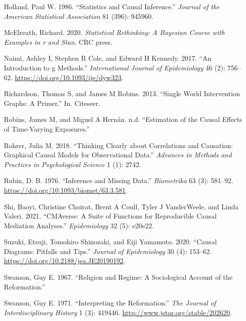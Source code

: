 \documentclass[
  singlecolumn]{report}
\newlength{\cslhangindent}
\newlength{\cslentryspacingunit} %
\newenvironment{CSLReferences}[2] %
 {%
  \setlength{\parindent}{0pt}
  \ifodd #1
  \let\oldpar\par
  \def\par{\hangindent=\cslhangindent\oldpar}
  \fi
  \setlength{\parskip}{#2\cslentryspacingunit}
 }%
 {}
\begin{document}
\begin{CSLReferences}{1}{0}
\leavevmode{}%
Holland, Paul W. 1986. {``Statistics and Causal Inference.''}
\emph{Journal of the American Statistical Association} 81 (396): 945960.

\leavevmode{}%
McElreath, Richard. 2020. \emph{Statistical Rethinking: A Bayesian
Course with Examples in r and Stan}. CRC press.

\leavevmode{}%
Naimi, Ashley I, Stephen R Cole, and Edward H Kennedy. 2017. {``An
Introduction to g Methods.''} \emph{International Journal of
Epidemiology} 46 (2): 756--62. \url{https://doi.org/10.1093/ije/dyw323}.

\leavevmode{}%
Richardson, Thomas S, and James M Robins. 2013. {``Single World
Intervention Graphs: A Primer.''} In. Citeseer.

\leavevmode{}%
Robins, James M, and Miguel A Hernán. n.d. {``Estimation of the Causal
Effects of Time-Varying Exposures.''}

\leavevmode{}%
Rohrer, Julia M. 2018. {``Thinking Clearly about Correlations and
Causation: Graphical Causal Models for Observational Data.''}
\emph{Advances in Methods and Practices in Psychological Science} 1 (1):
2742.

\leavevmode{}%
Rubin, D. B. 1976. {``Inference and Missing Data.''} \emph{Biometrika}
63 (3): 581--92. \url{https://doi.org/10.1093/biomet/63.3.581}.

\leavevmode{}%
Shi, Baoyi, Christine Choirat, Brent A Coull, Tyler J VanderWeele, and
Linda Valeri. 2021. {``CMAverse: A Suite of Functions for Reproducible
Causal Mediation Analyses.''} \emph{Epidemiology} 32 (5): e20e22.

\leavevmode{}%
Suzuki, Etsuji, Tomohiro Shinozaki, and Eiji Yamamoto. 2020. {``Causal
Diagrams: Pitfalls and Tips.''} \emph{Journal of Epidemiology} 30 (4):
153--62. \url{https://doi.org/10.2188/jea.JE20190192}.

\leavevmode{}%
Swanson, Guy E. 1967. {``Religion and Regime: A Sociological Account of
the Reformation.''}

\leavevmode{}%
Swanson, Guy E. 1971. {``Interpreting the Reformation.''} \emph{The
Journal of Interdisciplinary History} 1 (3): 419446.
\url{http://www.jstor.org/stable/202620}.


\end{CSLReferences}
\end{document}

